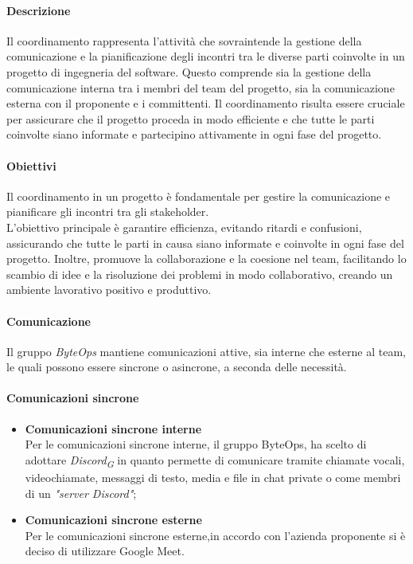 \paragraph{Descrizione}
Il coordinamento rappresenta l'attività che sovraintende la gestione della comunicazione e la pianificazione degli incontri tra le diverse parti coinvolte in un progetto di ingegneria del software. Questo comprende sia la gestione della comunicazione interna tra i membri del team del progetto, sia la comunicazione esterna con il proponente e i committenti. Il coordinamento risulta essere cruciale per assicurare che il progetto proceda in modo efficiente e che tutte le parti coinvolte siano informate e partecipino attivamente in ogni fase del progetto.

\paragraph{Obiettivi}
Il coordinamento in un progetto è fondamentale per gestire la comunicazione e pianificare gli incontri tra gli stakeholder. \\
L'obiettivo principale è garantire efficienza, evitando ritardi e confusioni, assicurando che tutte le parti in causa siano informate e coinvolte in ogni fase del progetto. Inoltre, promuove la collaborazione e la coesione nel team, facilitando lo scambio di idee e la risoluzione dei problemi in modo collaborativo, creando un ambiente lavorativo positivo e produttivo.

\paragraph*{Comunicazione}
Il gruppo \textit{ByteOps} mantiene comunicazioni attive, sia interne che esterne al team, le quali possono essere sincrone o asincrone, a seconda delle necessità.

\paragraph{Comunicazioni sincrone}
\begin{itemize}
  \item \textbf{Comunicazioni sincrone interne} \\
  Per le comunicazioni sincrone interne, il gruppo ByteOps, ha scelto di adottare \textit{Discord}\textsubscript{\textit{G}} in quanto permette di comunicare tramite chiamate vocali, videochiamate, messaggi di testo, media e file in chat private o come membri di un \textit{"server Discord"};

  \item \textbf{Comunicazioni sincrone esterne} \\
  Per le comunicazioni sincrone esterne,in accordo con l'azienda proponente si è deciso di utilizzare Google Meet.
\end{itemize}

